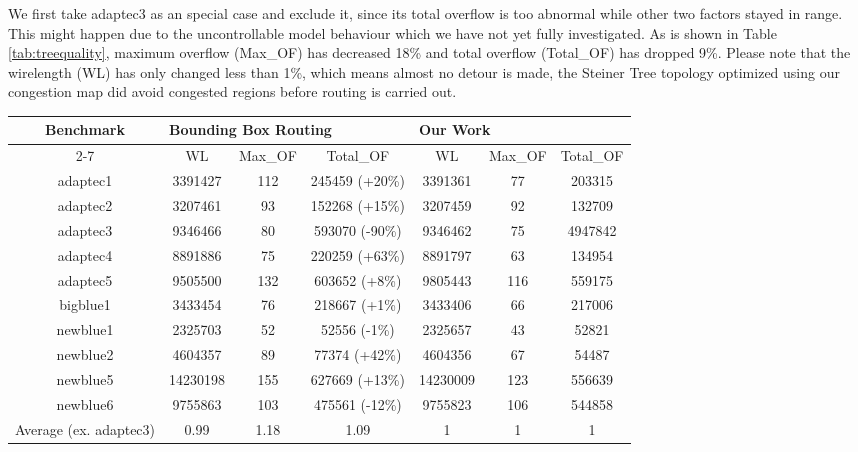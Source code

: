 We first take adaptec3 as an special case and exclude it, since its total overflow is too abnormal while other two factors stayed in range. This might happen due to the uncontrollable model behaviour which we have not yet fully investigated. As is shown in Table \ref{tab:treequality}, maximum overflow (Max\_OF) has decreased 18\% and total overflow (Total\_OF) has dropped 9\%. Please note that the wirelength (WL) has only changed less than 1\%, which means almost no detour is made, the Steiner Tree topology optimized using our congestion map did avoid congested regions before routing is carried out.



\begin{table*}[htbp]
\caption{Result of Steiner Tree quality after edge shifting}
\begin{center}
\begin{tabular}{|c|c|c|c|c|c|c|}
\hline
\multirow{2}{*}{Benchmark} & \multicolumn{3}{l|}{Bounding Box Routing}     & \multicolumn{3}{l|}{Our Work}  \\ \cline{2-7} 
                           & WL       & Max\_OF & Total\_OF      & WL       & Max\_OF & Total\_OF \\ \hline
adaptec1                   & 3391427  & 112     & 245459 (+20\%) & 3391361  & 77      & 203315    \\ \hline
adaptec2                   & 3207461  & 93      & 152268 (+15\%) & 3207459  & 92      & 132709    \\ \hline
adaptec3                   & 9346466  & 80      & 593070 (-90\%) & 9346462  & 75      & 4947842   \\ \hline
adaptec4                   & 8891886  & 75      & 220259 (+63\%) & 8891797  & 63      & 134954    \\ \hline
adaptec5                   & 9505500  & 132     & 603652 (+8\%)  & 9805443  & 116     & 559175    \\ \hline
bigblue1                   & 3433454  & 76      & 218667 (+1\%)  & 3433406  & 66      & 217006    \\ \hline
newblue1                   & 2325703  & 52      & 52556 (-1\%)   & 2325657  & 43      & 52821     \\ \hline
newblue2                   & 4604357  & 89      & 77374 (+42\%)  & 4604356  & 67      & 54487     \\ \hline
newblue5                   & 14230198 & 155     & 627669 (+13\%) & 14230009 & 123     & 556639    \\ \hline
newblue6                   & 9755863  & 103     & 475561 (-12\%) & 9755823  & 106     & 544858    \\ \hline
Average (ex. adaptec3)     & 0.99     & 1.18    & 1.09           & 1        & 1       & 1         \\ \hline
\end{tabular}
\label{tab:treequality}
\end{center}
\end{table*}

